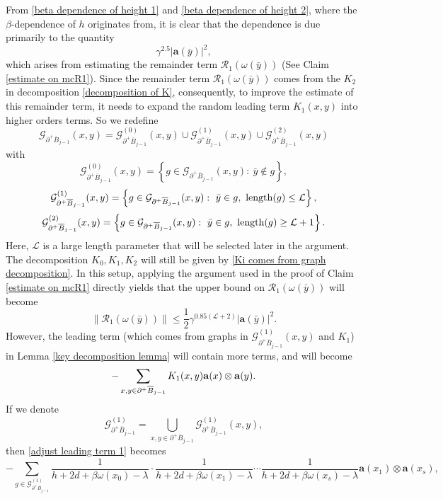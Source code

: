 \documentclass[11pt,reqno,UTF8,twoside]{amsart}
\newcommand{\length}{{\rm length}}
\newcommand{\bfa}{\mathbf{a}}
\newcommand{\mcR}{\mathcal{R}}
\newcommand{\mcL}{\mathcal{L}}
\newcommand{\mcG}{\mathcal{G}}
\newcommand{\barB}{\overline{B}}
\theoremstyle{definition}
\numberwithin{equation}{section}
\begin{document}
From \eqref{beta dependence of height 1} and \eqref{beta dependence of height 2}, where the $\beta$-dependence of $h$ originates from, it is clear that the dependence is due primarily to the quantity
\[\gamma^{2.5}|\bfa(\bar{y})|^2 ,\]
which arises from estimating the remainder term $\mathcal{R}_1(\omega(\bar{y}))$ (See Claim \ref{estimate on mcR1}).  Since the remainder term $\mcR_1(\omega(\bar{y}))$ comes from the $K_2$ in decomposition \eqref{decomposition of K}, consequently, to improve the estimate of this remainder term,  it needs to  expand the random leading term $K_1(x,y)$ into   higher orders terms.  So we redefine 
\[\mcG_{\partial^+ \barB_{j-1}}(x,y) =\mcG_{\partial^+ \barB_{j-1}}^{(0)} (x,y)\cup \mcG_{\partial^+ \barB_{j-1}}^{(1)} (x,y)\cup \mcG_{\partial^+ \barB_{j-1}}^{(2)} (x,y) \]
with
\[\mcG_{\partial^+ \barB_{j-1}}^{(0)} (x,y)= \left\{ g\in \mcG_{\partial^+ \barB_{j-1}} (x,y) :\  \bar{y}\notin g \right\},\]
\[\mcG_{\partial^+ \barB_{j-1}}^{(1)} (x,y)= \left\{ g\in \mcG_{\partial^+ \barB_{j-1}} (x,y) : \ \bar{y}\in g ,\ \length(g)\leq \mcL \right\},\]
\[\mcG_{\partial^+ \barB_{j-1}}^{(2)} (x,y)= \left\{ g\in \mcG_{\partial^+ \barB_{j-1}} (x,y) : \ \bar{y}\in g ,\ \length(g)\geq \mcL+1 \right\}.\]
Here, $\mcL$ is a large length parameter that will be selected later in the argument. The decomposition $K_0,K_1,K_2$ will still be given by \eqref{Ki comes from graph decomposition}.  In  this setup, applying the argument used in the proof of Claim \ref{estimate on mcR1} directly yields that the upper bound on $\mcR_1(\omega(\bar{y}))$  will become 
\begin{equation}\label{adjusting estimate on mcR1}
  \| \mcR_1(\omega(\bar{y}))\| \leq \frac{1}{2} \gamma^{0.85(\mcL+2)} |\bfa(\bar{y})|^2.
\end{equation}
However, the leading term (which comes from graphs in $\mcG_{\partial^+ \barB_{j-1}}^{(1)} (x,y)$ and $K_1$) in Lemma \ref{key decomposition lemma} will contain more terms, and will  become 
\begin{equation}\label{adjust leading term 1}
  - \sum_{x,y\in \partial^+ \barB_{j-1}} K_1(x,y) {\bf a}(x) \otimes {\bf a}(y).
\end{equation}
If we denote 
\begin{equation*}
  \mcG_{\partial^+ \barB_{j-1}}^{(1)} = \bigcup_{x,y\in \partial^+ \barB_{j-1}} \mcG_{\partial^+ \barB_{j-1}}^{(1)} (x,y),
\end{equation*}
then \eqref{adjust leading term 1} becomes
\begin{equation}\label{adjust leading term 2}
  -\sum_{g\in \mcG_{\partial^+ \barB_{j-1}}^{(1)}} \frac{1}{h+2d+\beta \omega(x_0)-\lambda}\cdot \frac{1}{h+2d+\beta\omega(x_1)-\lambda} \cdots   \frac{1}{h+2d+\beta\omega(x_s)-\lambda} \bfa(x_1)\otimes \bfa(x_s),
\end{equation}
\end{document}
